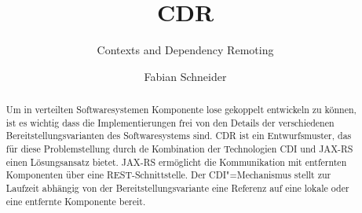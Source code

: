 \documentclass[german,a4paper]{llncs}
\begin{document}
\title{CDR}															%
\subtitle{Contexts and Dependency Remoting}							%
\author{Fabian Schneider}					    						%
           
\maketitle

\begin{acronym}
\end{acronym}

\begin{abstract}
Um in verteilten Softwaresystemen Komponente lose gekoppelt entwickeln zu können, ist es wichtig dass die Implementierungen frei von den Details der verschiedenen Bereitstellungsvarianten des Softwaresystems sind. 
\ac{CDR} ist ein Entwurfsmuster, das für diese Problemstellung durch de Kombination der Technologien \ac{CDI} und \ac{JAX-RS} einen Lösungsansatz bietet. 
\ac{JAX-RS} ermöglicht die Kommunikation mit entfernten Komponenten über eine \ac{REST}-Schnittstelle. 
Der \ac{CDI}"=Mechanismus stellt zur Laufzeit abhängig von der Bereitstellungsvariante eine Referenz auf eine lokale oder eine entfernte Komponente bereit.
\end{abstract}








\vspace{-20pt}

%

\end{document}
